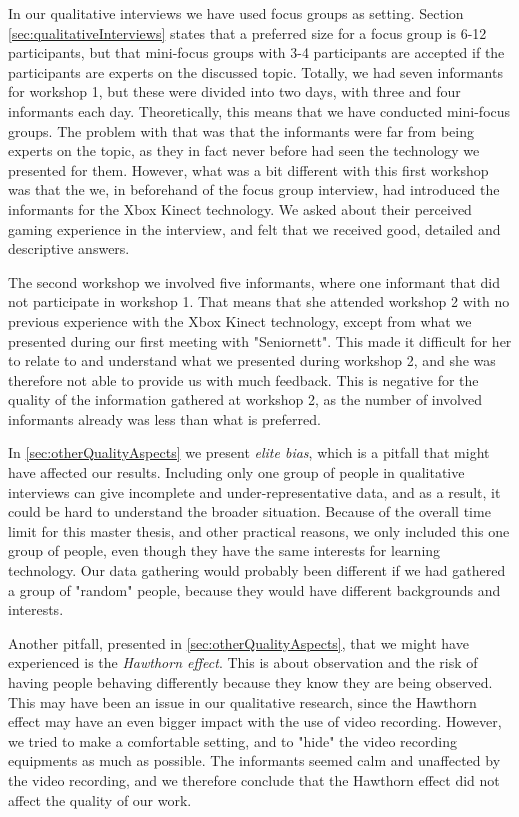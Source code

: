 In our qualitative interviews we have used focus groups as setting. Section \ref{sec:qualitativeInterviews} states that a preferred size for a focus group is 6-12 participants, but that mini-focus groups with 3-4 participants are accepted if the participants are experts on the discussed topic. Totally, we had seven informants for workshop 1, but these were divided into two days, with three and four informants each day. Theoretically, this means that we have conducted mini-focus groups. The problem with that was that the informants were far from being experts on the topic, as they in fact never before had seen the technology we presented for them. However, what was a bit different with this first workshop was that the we, in beforehand of the focus group interview, had introduced the informants for the Xbox Kinect technology. We asked about their perceived gaming experience in the interview, and felt that we received good, detailed and descriptive answers. 

The second workshop we involved five informants, where one informant that did not participate in workshop 1. That means that she attended workshop 2 with no previous experience with the Xbox Kinect technology, except from what we presented during our first meeting with "Seniornett". This made it difficult for her to relate to and understand what we presented during workshop 2, and she was therefore not able to provide us with much feedback. This is negative for the quality of the information gathered at workshop 2, as the number of involved informants already was less than what is preferred. 

In \ref{sec:otherQualityAspects} we present \emph{elite bias}, which is a pitfall that might have affected our results. Including only one group of people in qualitative interviews can give incomplete and under-representative data, and as a result, it could be hard to understand the broader situation. Because of the overall time limit for this master thesis, and other practical reasons, we only included this one group of people, even though they have the same interests for learning technology. Our data gathering would probably been different if we had gathered a group of "random" people, because they would have different backgrounds and interests.

Another pitfall, presented in \ref{sec:otherQualityAspects}, that we might have experienced  is the \emph{Hawthorn effect}. This is about observation and the risk of having people behaving differently because they know they are being observed. This may have been an issue in our qualitative research, since the Hawthorn effect may have an even bigger impact with the use of video recording. However, we tried to make a comfortable setting, and to "hide" the video recording equipments as much as possible. The informants seemed calm and unaffected by the video recording, and we therefore conclude that the Hawthorn effect did not affect the quality of our work. 

